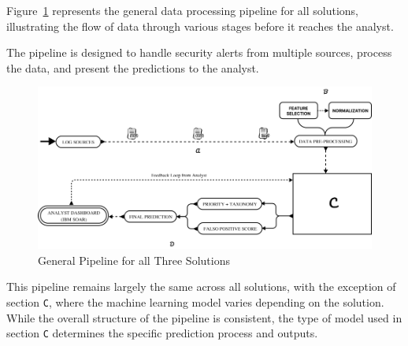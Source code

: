 Figure~\ref{fig:general_solution_pipeline} represents the general data processing pipeline for all solutions, illustrating the flow of data through various stages before it reaches the analyst. 

The pipeline is designed to handle security alerts from multiple sources, process the data, and present the predictions to the analyst.

\begin{figure}[h!]
    \centering
    \includegraphics[width=\textwidth]{ch3/assets/general_solution_pipeline.png}
    \caption{General Pipeline for all Three Solutions}
    \label{fig:general_solution_pipeline}
\end{figure}

This pipeline remains largely the same across all solutions, with the exception of section \texttt{C}, where the machine learning model varies depending on the solution. 
While the overall structure of the pipeline is consistent, the type of model used in section \texttt{C} determines the specific prediction process and outputs.

